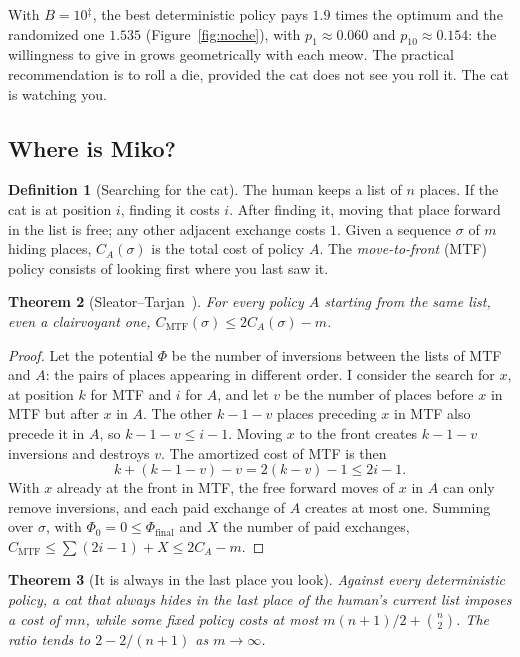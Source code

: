 \documentclass[11pt,a4paper]{article}
\theoremstyle{plain}
\newtheorem{teorema}{Theorem}[section]
\theoremstyle{definition}
\newtheorem{definicion}[teorema]{Definition}
\theoremstyle{remark}
\numberwithin{equation}{section}
\newcommand{\calib}{{\ensuremath{^{\ddagger}}}}
\begin{document}
With $B=10$\calib, the best deterministic policy pays $1.9$ times the optimum and the randomized one $1.535$ (Figure~\ref{fig:noche}), with $p_1\approx 0.060$ and $p_{10}\approx 0.154$: the willingness to give in grows geometrically with each meow. The practical recommendation is to roll a die, provided the cat does not see you roll it. The cat is watching you.

\subsection{Where is Miko?}

\begin{definicion}[Searching for the cat]
The human keeps a list of $n$ places. If the cat is at position $i$, finding it costs $i$. After finding it, moving that place forward in the list is free; any other adjacent exchange costs $1$. Given a sequence $\sigma$ of $m$ hiding places, $C_A(\sigma)$ is the total cost of policy $A$. The \emph{move-to-front} (MTF) policy consists of looking first where you last saw it.
\end{definicion}

\begin{teorema}[Sleator--Tarjan~\cite{sleator}]\label{teo:mtf}
For every policy $A$ starting from the same list, even a clairvoyant one, $C_{\mathrm{MTF}}(\sigma)\le 2C_A(\sigma)-m$.
\end{teorema}

\begin{proof}
Let the potential $\Phi$ be the number of inversions between the lists of MTF and $A$: the pairs of places appearing in different order. I consider the search for $x$, at position $k$ for MTF and $i$ for $A$, and let $v$ be the number of places before $x$ in MTF but after $x$ in $A$. The other $k-1-v$ places preceding $x$ in MTF also precede it in $A$, so $k-1-v\le i-1$. Moving $x$ to the front creates $k-1-v$ inversions and destroys $v$. The amortized cost of MTF is then
\begin{equation}
  k+(k-1-v)-v=2(k-v)-1\le 2i-1.
\end{equation}
With $x$ already at the front in MTF, the free forward moves of $x$ in $A$ can only remove inversions, and each paid exchange of $A$ creates at most one. Summing over $\sigma$, with $\Phi_0=0\le\Phi_{\mathrm{final}}$ and $X$ the number of paid exchanges, $C_{\mathrm{MTF}}\le\sum(2i-1)+X\le 2C_A-m$.
\end{proof}

\begin{teorema}[It is always in the last place you look]\label{teo:ultimo}
Against every deterministic policy, a cat that always hides in the last place of the human's current list imposes a cost of $mn$, while some fixed policy costs at most $m(n+1)/2+\binom n2$. The ratio tends to $2-2/(n+1)$ as $m\to\infty$.
\end{teorema}
\end{document}
